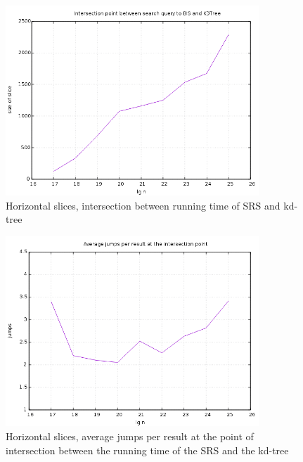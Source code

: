 \begin{figure}[h]
    \centering
    \includegraphics[width = 0.85\textwidth]{pictures/analysis/hori.png}
    \caption{Horizontal slices, intersection between running time of SRS and kd-tree}\label{fig:hori_intersection}
\end{figure}


\begin{figure}[h]
    \centering
    \includegraphics[width = 0.85\textwidth]{pictures/analysis/hori_jumps_per_lgn.png}
    \caption{Horizontal slices, average jumps per result at the point of intersection between the running time of the SRS and the kd-tree}\label{fig:hori_jumps_per_lgn}
\end{figure}


